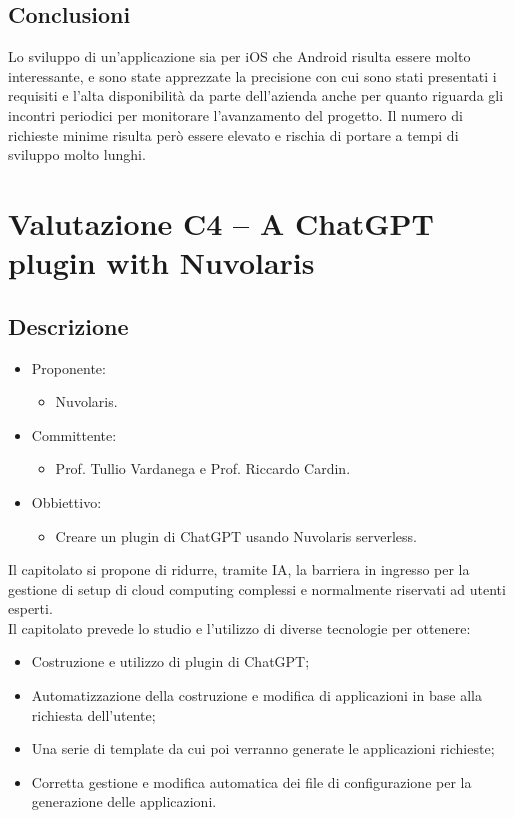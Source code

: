 \documentclass[a4paper, twoside]{article}
\begin{document}
        \subsection{Conclusioni}
        Lo sviluppo di un'applicazione sia per iOS che Android risulta essere molto interessante, e sono state apprezzate la precisione con cui sono stati presentati i requisiti e l'alta disponibilità da parte dell'azienda anche per quanto riguarda gli incontri periodici per monitorare l'avanzamento del progetto. Il numero di richieste minime risulta però essere elevato e rischia di portare a tempi di sviluppo molto lunghi.

\section{Valutazione C4 -- A ChatGPT plugin with Nuvolaris}
        \subsection{Descrizione}
        \begin{itemize}
            \item Proponente:
            \begin{itemize}
                \item Nuvolaris.
            \end{itemize}
            \item Committente:
            \begin{itemize}
                \item Prof. Tullio Vardanega e Prof.
                Riccardo Cardin.
            \end{itemize}
            \item Obbiettivo:
            \begin{itemize}
                \item Creare un plugin di ChatGPT usando Nuvolaris serverless.
            \end{itemize}
        \end{itemize}
        Il capitolato si propone di ridurre, tramite IA, la barriera in ingresso
        per la gestione di setup di cloud computing complessi e normalmente
        riservati ad utenti esperti.\\
        Il capitolato prevede lo studio e l'utilizzo di diverse tecnologie
        per ottenere:
        \begin{itemize}
            \item Costruzione e utilizzo di plugin di ChatGPT;
            \item Automatizzazione della costruzione e modifica di applicazioni
            in base alla richiesta dell'utente;
            \item Una serie di template da cui poi verranno generate le
            applicazioni richieste;
            \item Corretta gestione e modifica automatica dei file di
            configurazione per la generazione delle applicazioni.
        \end{itemize}
\end{document}
